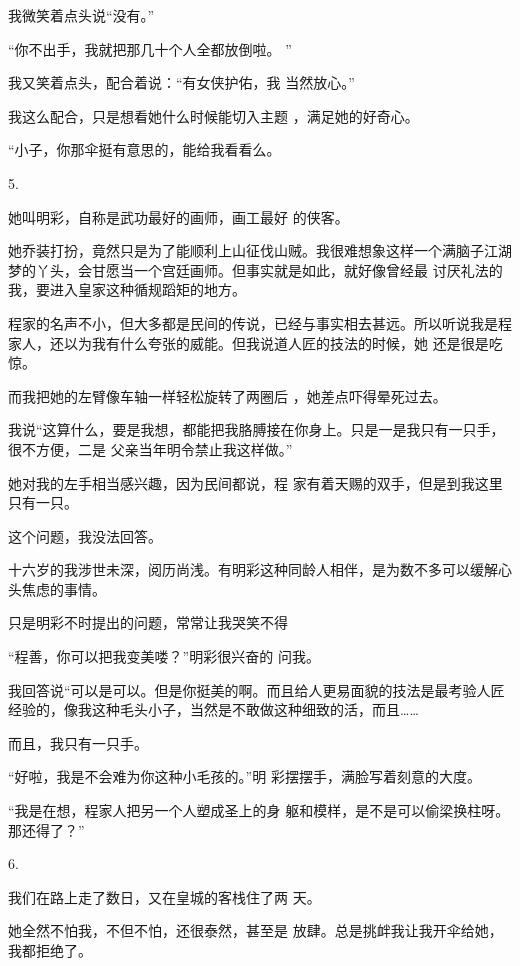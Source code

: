 \documentclass{article}
\begin{document}
我微笑着点头说“没有。” 

\newpage

“你不出手，我就把那几十个人全都放倒啦。
” 

我又笑着点头，配合着说：“有女侠护佑，我
当然放心。” 

我这么配合，只是想看她什么时候能切入主题
，满足她的好奇心。 

“小子，你那伞挺有意思的，能给我看看么。


5. 

她叫明彩，自称是武功最好的画师，画工最好
的侠客。 

她乔装打扮，竟然只是为了能顺利上山征伐山贼。我很难想象这样一个满脑子江湖梦的丫头，会甘愿当一个宫廷画师。但事实就是如此，就好像曾经最
讨厌礼法的我，要进入皇家这种循规蹈矩的地方。 

\newpage

程家的名声不小，但大多都是民间的传说，已经与事实相去甚远。所以听说我是程家人，还以为我有什么夸张的威能。但我说道人匠的技法的时候，她
还是很是吃惊。 

而我把她的左臂像车轴一样轻松旋转了两圈后
，她差点吓得晕死过去。 

我说“这算什么，要是我想，都能把我胳膊接在你身上。只是一是我只有一只手，很不方便，二是
父亲当年明令禁止我这样做。” 

她对我的左手相当感兴趣，因为民间都说，程
家有着天赐的双手，但是到我这里只有一只。 


这个问题，我没法回答。 

十六岁的我涉世未深，阅历尚浅。有明彩这种同龄人相伴，是为数不多可以缓解心头焦虑的事情。

只是明彩不时提出的问题，常常让我哭笑不得
\newpage


“程善，你可以把我变美喽？”明彩很兴奋的
问我。 

我回答说“可以是可以。但是你挺美的啊。而且给人更易面貌的技法是最考验人匠经验的，像我这种毛头小子，当然是不敢做这种细致的活，而且……


而且，我只有一只手。 

“好啦，我是不会难为你这种小毛孩的。”明
彩摆摆手，满脸写着刻意的大度。 

“我是在想，程家人把另一个人塑成圣上的身
躯和模样，是不是可以偷梁换柱呀。那还得了？” 


6. 

我们在路上走了数日，又在皇城的客栈住了两
天。 

\newpage

她全然不怕我，不但不怕，还很泰然，甚至是
放肆。总是挑衅我让我开伞给她，我都拒绝了。 
\end{document}
